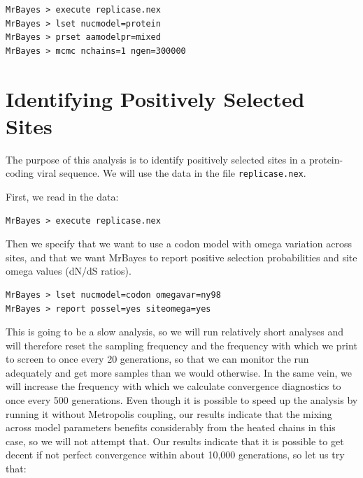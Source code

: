 \documentclass[12pt]{book}
\newcommand{\ttt}[1]{\texttt{#1}}
\begin{document}
\begin{singlespacing}
\small
\begin{verbatim}
MrBayes > execute replicase.nex
MrBayes > lset nucmodel=protein
MrBayes > prset aamodelpr=mixed
MrBayes > mcmc nchains=1 ngen=300000
\end{verbatim}
\normalsize
\end{singlespacing}

\section{Identifying Positively Selected Sites}

The purpose of this analysis is to identify positively selected sites in a protein-coding viral
sequence. We will use the data in the file \ttt{replicase.nex}.

First, we read in the data:

\begin{singlespacing}
\small
\begin{verbatim}
MrBayes > execute replicase.nex
\end{verbatim}
\normalsize
\end{singlespacing}

Then we specify that we want to use a codon model with omega variation across sites, and that we
want MrBayes to report positive selection probabilities and site omega values (dN/dS ratios).

\begin{singlespacing}
\small
\begin{verbatim}
MrBayes > lset nucmodel=codon omegavar=ny98
MrBayes > report possel=yes siteomega=yes
\end{verbatim}
\normalsize
\end{singlespacing}

This is going to be a slow analysis, so we will run relatively short analyses and will therefore
reset the sampling frequency and the frequency with which we print to screen to once every 20
generations, so that we can monitor the run adequately and get more samples than we would
otherwise. In the same vein, we will increase the frequency with which we calculate convergence
diagnostics to once every 500 generations. Even though it is possible to speed up the analysis by
running it without Metropolis coupling, our results indicate that the mixing across model
parameters benefits considerably from the heated chains in this case, so we will not attempt that.
Our results indicate that it is possible to get decent if not perfect convergence within about
10,000 generations, so let us try that:
\end{document}
